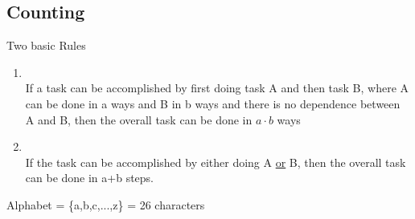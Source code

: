 \documentclass[12pt,a4paper]{article}
\begin{document}
\subsection{Counting}
Two basic Rules
\begin{enumerate}
	\item {} \\
	If a task can be accomplished by first doing task A and then task B, where A can be done in a ways and B in b ways and there is no dependence between A and B, then the overall task can be done in $a\cdot b$ ways
	\item {}\\
	If the task can be accomplished by either doing A \underline{or} B, then the overall task can be done in a+b steps.
\end{enumerate}
Alphabet = \{a,b,c,...,z\} = 26 characters
\end{document}
